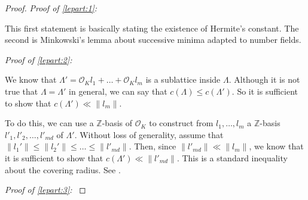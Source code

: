 \documentclass{amsart}
\newcommand{\OK}{\mathcal{O}_K}
\begin{document}
\begin{proof}

{ \em Proof of \ref{lepart:1}: }

This first statement is basically stating the existence of Hermite's constant.
The second is Minkowski's lemma about successive minima adapted to number fields. 

{ \em Proof of \ref{lepart:2}: }

We know that $\Lambda' = \OK l_1 + \dots + \OK l_m$ is a sublattice inside $\Lambda$. Although it is not true that $\Lambda = \Lambda'$ in general, we can say that  $c(\Lambda) \leq c(\Lambda')$.
So it is sufficient to show that $c(\Lambda') \ll \|l_m\|$.

To do this, we can use a $\mathbb{Z}$-basis of $\OK$ to construct from $l_1,\dots,l_m$ 
a $\mathbb{Z}$-basis $l'_{1},l'_{2}, \dots , l'_{md}$ of $\Lambda'$. Without loss of generality, assume that $\|l_1'\| \leq \|l_2'\| \leq \dots  \leq \|l'_{md}\|$. Then, since $ \|l'_{md}\| \ll \|l_{m}\|$,
we know that it is sufficient to show that $c(\Lambda')\ll \|l'_{md}\|$.
This is a standard inequality about the covering radius. See \cite{C12}.

{ \em Proof of \ref{lepart:3}: }


\end{proof}
\end{document}
